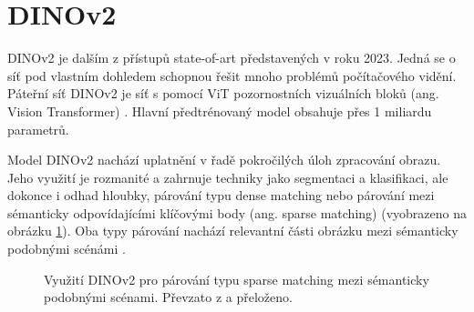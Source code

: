 \section{DINOv2}
\label{sec:Chapter27}

DINOv2 je dalším z přístupů state-of-art představených v \cite{dinov2} roku 2023. Jedná se o síť pod vlastním dohledem schopnou řešit mnoho problémů počítačového vidění. Páteřní síť DINOv2 je síť s pomocí ViT pozornostních vizuálních bloků (ang. Vision Transformer) \cite{vit}. Hlavní předtrénovaný model obsahuje přes 1 miliardu parametrů.

Model DINOv2 nachází uplatnění v řadě pokročilých úloh zpracování obrazu. Jeho využití je rozmanité a zahrnuje techniky jako segmentaci a klasifikaci, ale dokonce i odhad hloubky, párování typu dense matching nebo párování mezi sémanticky odpovídajícími klíčovými body (ang. sparse matching) (vyobrazeno na obrázku \ref{fig:dinov2_sparse_matching}). Oba typy párování nachází relevantní části obrázku mezi sémanticky podobnými scénámi \cite{dinov2.metademolab.com}.

\begin{figure}[H]
\centering

\newcommand{\subfiguresize}{.15\textwidth}
\newcommand{\imagewidth}{1.0in}
\newcommand{\hspacesize}{.43in}

\newcommand{\insertimage}[1]{%
  \begin{minipage}{\imagewidth}
    \centering
    \texttt{[image: \#1]}
  \end{minipage}
}

\hspace{\hspacesize}%

\caption[Využití DINOv2 pro párování typu sparse matching]
{Využití DINOv2 pro párování typu sparse matching mezi sémanticky podobnými scénami. Převzato z \cite{dinov2} a přeloženo.}
\label{fig:dinov2_sparse_matching}
\end{figure}

\endinput